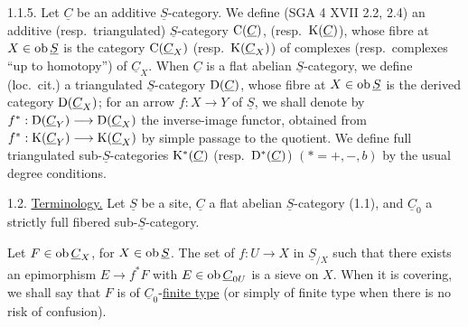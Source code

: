1.1.5. Let \(\underline{C}\) be an additive \(\underline{S}\)-category. We define (SGA 4 XVII 2.2, 2.4) an additive (resp.\ triangulated) \(\underline{S}\)-category \(\mathrm C(\underline{C})\), (resp.\ \(\mathrm K(\underline{C})\)), whose fibre at \(X\in\operatorname{ob} \underline{S}\) is the category \(\mathrm C(\underline{C}_X)\) (resp.\ \(\mathrm K(\underline{C}_X)\)) of complexes (resp.\ complexes ``up to homotopy'') of \(\underline{C}_X\). When \(\underline{C}\) is a flat abelian \(\underline{S}\)-category, we define (loc.\ cit.) a triangulated \(\underline{S}\)-category \(\mathrm D(\underline{C})\), whose fibre at \(X\in\operatorname{ob} \underline{S}\) is the derived category \(\mathrm D(\underline{C}_X)\); for an arrow \(f:X\to Y\) of \(\underline{S}\), we shall denote by \(f^*:\mathrm D(\underline{C}_Y)\longrightarrow \mathrm D(\underline{C}_X)\) the inverse-image functor, obtained from \(f^*:\mathrm K(\underline{C}_Y)\longrightarrow \mathrm K(\underline{C}_X)\) by simple passage to the quotient. We define full triangulated sub-\(\underline{S}\)-categories \(\mathrm K^*(\underline{C})\) (resp.\ \(\mathrm D^*(\underline{C})\)) \((*=+,-,b)\) by the usual degree conditions.

1.2. \uline{Terminology.} Let \(\underline{S}\) be a site, \(\underline{C}\) a flat abelian \(\underline{S}\)-category (1.1), and \(\underline{C}_0\) a strictly full fibered sub-\(\underline{S}\)-category.

Let \(F\in\operatorname{ob}\underline{C}_X\), for \(X\in\operatorname{ob} \underline{S}\). The set of \(f:U\to X\) in \(\underline{S}_{/X}\) such that there exists an epimorphism \(E\longrightarrow f^*F\) with \(E\in\operatorname{ob}\underline{C}_{0U}\) is a sieve on \(X\). When it is covering, we shall say that \(F\) is of \(\underline{C}_0\)-\uline{finite type} (or simply of finite type when there is no risk of confusion).


